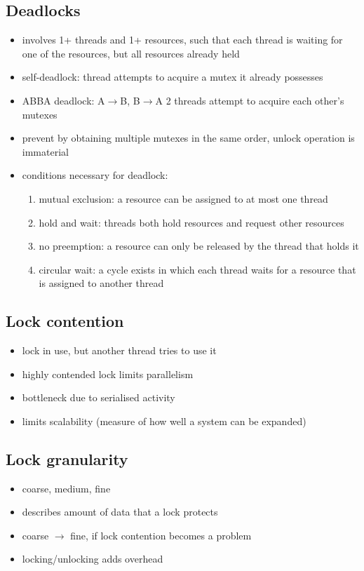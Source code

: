 \documentclass[10pt, multicolumn, a4paper]{article}
\begin{document}
\begin{multicols}{2}
	\subsection*{Deadlocks}
	\begin{itemize}
	\item involves 1+ threads and 1+ resources, such that each thread is waiting for one of the resources, but all resources already held 
	\item self-deadlock: thread attempts to acquire a mutex it already possesses
	\item ABBA deadlock: A$\rightarrow$B, B$\rightarrow$A 2 threads attempt to acquire each other's mutexes
	\item prevent by obtaining multiple mutexes in the same order, unlock operation is immaterial
	\item conditions necessary for deadlock:
		\begin{enumerate}
		\item mutual exclusion: a resource can be assigned to at most one thread
		\item hold and wait: threads both hold resources and request other resources
		\item no preemption: a resource can only be released by the thread that holds it
		\item circular wait: a cycle exists in which each thread waits for a resource that is assigned to another thread
		\end{enumerate}
	\end{itemize}
	\subsection*{Lock contention}
	\begin{itemize}
	\item lock in use, but another thread tries to use it
	\item highly contended lock limits parallelism 
	\item bottleneck due to serialised activity
	\item limits scalability (measure of how well a system can be expanded)
	\end{itemize}
	\subsection*{Lock granularity}
	\begin{itemize}
	\item coarse, medium, fine
	\item describes amount of data that a lock protects
	\item coarse $\rightarrow$ fine, if lock contention becomes a problem
	\item locking/unlocking adds overhead
	\end{itemize}

\end{multicols}
\end{document}
